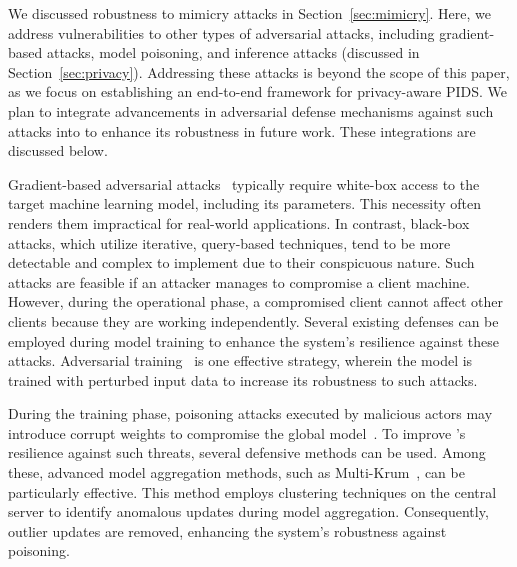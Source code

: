  We discussed robustness to mimicry attacks in Section~\ref{sec:mimicry}. Here, we address vulnerabilities to other types of adversarial attacks, including gradient-based attacks, model poisoning, and inference attacks (discussed in Section~\ref{sec:privacy}). Addressing these attacks is beyond the scope of this paper, as we focus on establishing an end-to-end framework for privacy-aware PIDS. We plan to integrate advancements in adversarial defense mechanisms against such attacks into \Sys to enhance its robustness in future work. These integrations are discussed below.

Gradient-based adversarial attacks~\cite{chakraborty2021survey} typically require white-box access to the target machine learning model, including its parameters. This necessity often renders them impractical for real-world applications. In contrast, black-box attacks, which utilize iterative, query-based techniques, tend to be more detectable and complex to implement due to their conspicuous nature. Such attacks are feasible if an attacker manages to compromise a client machine. However, during the operational phase, a compromised client cannot affect other clients because they are working independently. Several existing defenses can be employed during model training to enhance the system's resilience against these attacks. Adversarial training~\cite{tramer2019adversarial} is one effective strategy, wherein the model is trained with perturbed input data to increase its robustness to such attacks.

During the training phase, poisoning attacks executed by malicious actors may introduce corrupt weights to compromise the global model~\cite{jagielski2018manipulating}. To improve \Sys's resilience against such threats, several defensive methods can be used. Among these, advanced model aggregation methods, such as Multi-Krum~\cite{munoz2019byzantine}, can be particularly effective. This method employs clustering techniques on the central server to identify anomalous updates during model aggregation. Consequently, outlier updates are removed, enhancing the system's robustness against poisoning.

